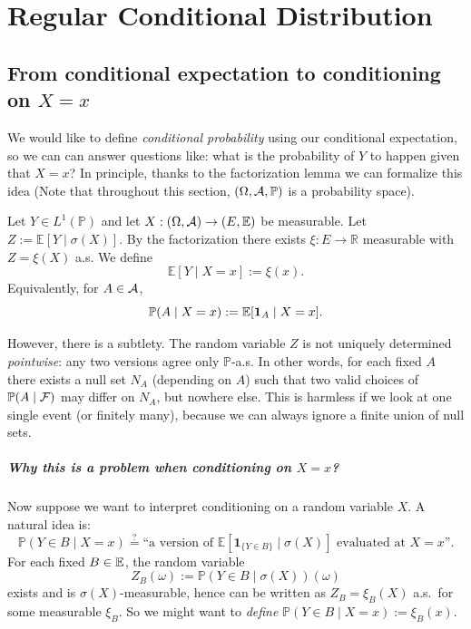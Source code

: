 \chapter{Regular Conditional Distribution}

\section{From conditional expectation to conditioning on \texorpdfstring{$X=x$}{X=x}}

We would like to define \emph{conditional probability} using our conditional expectation, so we can can answer questions like: what is the probability of $Y$ to happen given that $X=x$? In principle, thanks to the factorization lemma we can formalize this idea (Note that throughout this section, $(\Omega,\mathcal{A},\mathbb{P})$ is a probability space).

\begin{definition}[Conditional expectation given $X=x$]
\label{def:condexp_x}
Let $Y\in L^1(\mathbb{P})$ and let $X:(\Omega,\mathcal{A})\to(E,\mathbb{E})$ be measurable.
Let $Z:=\mathbb{E}[Y\mid \sigma(X)]$. By the factorization there exists $\xi:E\to\mathbb{R}$ measurable with
$Z=\xi(X)$ a.s. We define
\[
\mathbb{E}[Y\mid X=x] := \xi(x).
\]
Equivalently, for $A\in\mathcal{A}$,
\[
\mathbb{P}(A\mid X=x) := \mathbb{E}[\mathbf{1}_A\mid X=x].
\]
\end{definition}

However, there is a subtlety. The random variable $Z$ is not uniquely determined \emph{pointwise}: any two versions agree only $\mathbb{P}$-a.s.
In other words, for each fixed $A$ there exists a null set $N_A$ (depending on $A$) such that
two valid choices of $\mathbb{P}(A\mid \mathcal{F})$ may differ on $N_A$, but nowhere else.
This is harmless if we look at one single event (or finitely many), because we can always ignore a finite union of null sets.

\paragraph{Why this is a problem when conditioning on $X=x$?}
Now suppose we want to interpret conditioning on a random variable $X$.
A natural idea is:
\[
\mathbb{P}(Y\in B\mid X=x)\stackrel{?}{=}\text{``a version of }\mathbb{E}[\mathbf{1}_{\{Y\in B\}}\mid \sigma(X)]\text{ evaluated at }X=x\text{''}.
\]
For each fixed $B\in\mathbb{E}$, the random variable
\[
Z_B(\omega):=\mathbb{P}(Y\in B\mid \sigma(X))(\omega)
\]
exists and is $\sigma(X)$-measurable, hence can be written as $Z_B=\xi_B(X)$ a.s.\ for some measurable $\xi_B$.
So we might want to \emph{define} $\mathbb{P}(Y\in B\mid X=x):=\xi_B(x)$.

